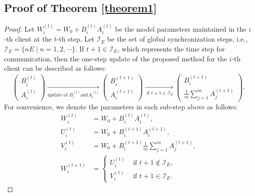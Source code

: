 \subsection{Proof of Theorem \ref{theorem1}} \label{sec:proof_theorem}
\begin{proof}
Let $W_i^{(t)}=W_0+B_i^{(t)}A_i^{(t)}$ be the model parameters maintained in the $i$-th client at the $t$-th step. Let $\mathcal{I}_E$ be the set of global synchronization steps, i.e., $\mathcal{I}_E=\{nE \mid n=1,2,\cdots\}$. If $t+1 \in \mathcal{I}_E$, which represents the time step for communication, then the one-step update of the proposed method for the $i$-th client can be described as follows:
\begin{equation*}
\left(\begin{array}{c}
B_i^{(t)} \\
A_i^{(t)}
\end{array}\right) \underset{\text{update  of } B_i^{(t)} \text{and} A_i^{(t)}}{\longrightarrow}\left(\begin{array}{c}
B_i^{(t+1)} \\
A_i^{(t+1)}
\end{array}\right) \underset{\text { if } t+1 \in \mathcal{I}_E}{\longrightarrow}\left(\begin{array}{c}
B_i^{(t+1)} \\
\frac{1}{m}\sum_{j=1}^m A_j^{(t+1)}
\end{array}\right).
\end{equation*}
For convenience, we denote the parameters in each sub-step above as follows:
\begin{equation*}
\begin{aligned}
W_i^{(t)} &= W_0 + B_i^{(t)}A_i^{(t)}, \\
U_i^{(t)} &= W_0 + B_i^{(t+1)}A_i^{(t+1)}, \\
V_i^{(t)} &= W_0 + B_i^{(t+1)} \frac{1}{m} \sum_{j=1}^m A_j^{(t+1)}, \\
W_i^{(t+1)} &= \begin{cases}U_i^{(t)} & \text { if } t+1 \notin \mathcal{I}_E, \\ V_i^{(t)} & \text { if } t+1 \in \mathcal{I}_E.\end{cases}

\end{aligned}
\end{equation*}
\end{proof}
